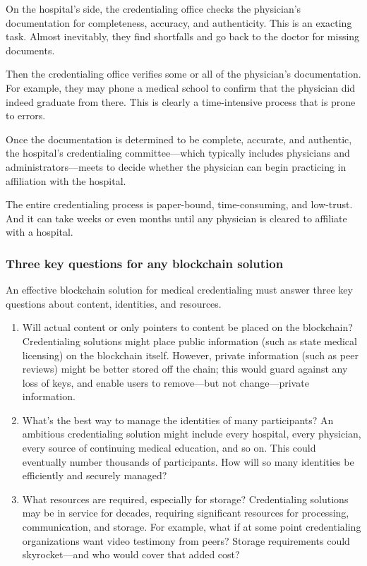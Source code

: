 On the hospital's side, the credentialing office checks the physician's
documentation for completeness, accuracy, and authenticity.  This is an
exacting task.  Almost inevitably, they find shortfalls and go back to
the doctor for missing documents.

Then the credentialing office verifies some or all of the physician's
documentation.  For example, they may phone a medical school to confirm
that the physician did indeed graduate from there.  This is clearly a
time-intensive process that is prone to errors.

Once the documentation is determined to be complete, accurate, and
authentic, the hospital's credentialing committee---which typically
includes physicians and administrators---meets to decide whether the
physician can begin practicing in affiliation with the hospital.

The entire credentialing process is paper-bound, time-consuming, and
low-trust. And it can take weeks or even months until any physician is
cleared to affiliate with a hospital.

\subsubsection{Three key questions for any blockchain solution}

An effective blockchain solution for medical credentialing must answer
three key questions about content, identities, and resources.

\begin{enumerate}
\item Will actual content or only pointers to content be placed on the
blockchain?  Credentialing solutions might place public information
(such as state medical licensing) on the blockchain itself.  However,
private information (such as peer reviews) might be better stored off
the chain; this would guard against any loss of keys, and enable users
to remove---but not change---private information.

\item What's the best way to manage the identities of many participants?
An ambitious credentialing solution might include every hospital, every
physician, every source of continuing medical education, and so on.
This could eventually number thousands of participants.  How will so
many identities be efficiently and securely managed?

\item What resources are required, especially for storage?
Credentialing solutions may be in service for decades, requiring
significant resources for processing, communication, and storage.  For
example, what if at some point credentialing organizations want video
testimony from peers? Storage requirements could skyrocket---and who
would cover that added cost?
\end{enumerate}

